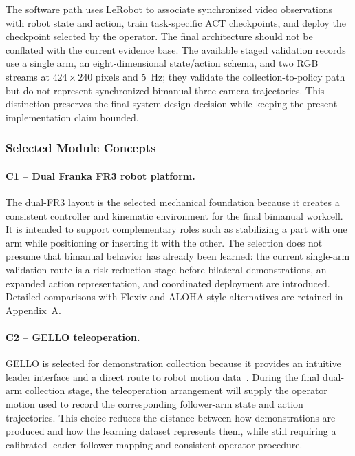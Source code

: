 \documentclass[12pt, letterpaper]{article}
\begin{document}
The software path uses LeRobot to associate synchronized video observations with robot state and action, train task-specific ACT checkpoints, and deploy the checkpoint selected by the operator. The final architecture should not be conflated with the current evidence base. The available staged validation records use a single arm, an eight-dimensional state/action schema, and two RGB streams at $424\times240$ pixels and 5~Hz; they validate the collection-to-policy path but do not represent synchronized bimanual three-camera trajectories. This distinction preserves the final-system design decision while keeping the present implementation claim bounded.

\subsubsection{Selected Module Concepts}

\paragraph{C1 -- Dual Franka FR3 robot platform.} The dual-FR3 layout is the selected mechanical foundation because it creates a consistent controller and kinematic environment for the final bimanual workcell. It is intended to support complementary roles such as stabilizing a part with one arm while positioning or inserting it with the other. The selection does not presume that bimanual behavior has already been learned: the current single-arm validation route is a risk-reduction stage before bilateral demonstrations, an expanded action representation, and coordinated deployment are introduced. Detailed comparisons with Flexiv and ALOHA-style alternatives are retained in Appendix~A.

\paragraph{C2 -- GELLO teleoperation.} GELLO is selected for demonstration collection because it provides an intuitive leader interface and a direct route to robot motion data~\cite{gello}. During the final dual-arm collection stage, the teleoperation arrangement will supply the operator motion used to record the corresponding follower-arm state and action trajectories. This choice reduces the distance between how demonstrations are produced and how the learning dataset represents them, while still requiring a calibrated leader--follower mapping and consistent operator procedure. 
\end{document}

